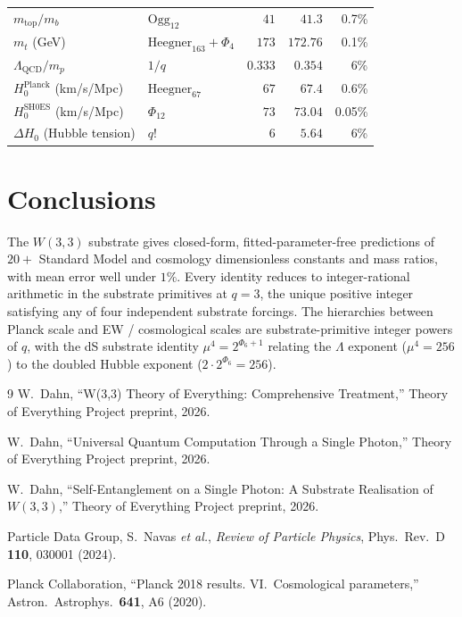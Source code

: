 \documentclass[11pt]{article}
\begin{document}
\begin{center}
\begin{tabular}{llrrr}
$m_{\mathrm{top}}/m_b$     & $\mathrm{Ogg}_{12}$              & $41$      & $41.3$    & 0.7\% \\
$m_t$ (GeV)                & $\mathrm{Heegner}_{163} + \Phi_4$ & $173$     & $172.76$  & 0.1\% \\
$\Lambda_{\mathrm{QCD}}/m_p$ & $1/q$                            & $0.333$   & $0.354$   & 6\% \\
$H_0^{\mathrm{Planck}}$ (km/s/Mpc) & $\mathrm{Heegner}_{67}$  & $67$      & $67.4$    & 0.6\% \\
$H_0^{\mathrm{SH0ES}}$ (km/s/Mpc)  & $\Phi_{12}$              & $73$      & $73.04$   & 0.05\% \\
$\Delta H_0$ (Hubble tension)      & $q!$                     & $6$       & $5.64$    & 6\% \\
\bottomrule
\end{tabular}\end{center}

\section{Conclusions}

The $W(3,3)$ substrate gives closed-form, fitted-parameter-free
predictions of $20+$ Standard Model and cosmology dimensionless
constants and mass ratios, with mean error well under $1\%$.  Every
identity reduces to integer-rational arithmetic in the substrate
primitives at $q = 3$, the unique positive integer satisfying any of
four independent substrate forcings.  The hierarchies between Planck
scale and EW / cosmological scales are substrate-primitive integer
powers of $q$, with the dS substrate identity $\mu^4 = 2^{\Phi_6+1}$
relating the $\Lambda$ exponent ($\mu^4 = 256$) to the doubled Hubble
exponent ($2 \cdot 2^{\Phi_6} = 256$).

\begin{thebibliography}{9}
  W.~Dahn, ``W(3,3) Theory of Everything: Comprehensive Treatment,''
  Theory of Everything Project preprint, 2026.

  W.~Dahn, ``Universal Quantum Computation Through a Single Photon,''
  Theory of Everything Project preprint, 2026.

  W.~Dahn, ``Self-Entanglement on a Single Photon: A Substrate
  Realisation of $W(3,3)$,'' Theory of Everything Project preprint, 2026.

  Particle Data Group, S.~Navas \emph{et al.},
  \emph{Review of Particle Physics},
  Phys.\ Rev.\ D \textbf{110}, 030001 (2024).

  Planck Collaboration, ``Planck 2018 results.  VI.~Cosmological parameters,''
  Astron.\ Astrophys.\ \textbf{641}, A6 (2020).
\end{thebibliography}
\end{document}
